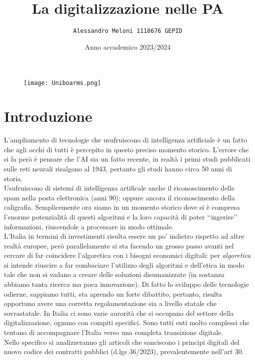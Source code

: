 \documentclass{article}
\title{\huge\textbf{La digitalizzazione nelle PA}}
\author{\texttt{Alessandro Meloni 1118676 GEPID}}
\date{Anno accademico 2023/2024}
\begin{document}
\begin{figure}
    \centering
    \texttt{[image: Uniboarms.png]}
\end{figure}
\maketitle

\centering \tableofcontents

\newpage\centering
\section{Introduzione}
\begin{justify}
L'ampliamento di tecnologie che usufruiscono di intelligenza artificiale è un fatto che agli occhi di tutti è percepito in questo preciso momento storico. L'errore che si fa però è pensare che l'AI sia un fatto recente, in realtà i primi studi pubblicati sulle reti neurali risalgono al 1943, pertanto gli studi hanno circa 50 anni di storia.\citep{mcculloch1943logical}\\ Usufruiscono di sistemi di intelligenza artificale anche il riconoscimento delle spam nella posta elettronica (anni 90); oppure ancora il riconoscimento della caligrafia. Semplicemente ora siamo in un momento storico dove si è compresa l'enorme potenzialità di questi algoritmi e la loro capacità di poter ‘‘ingerire’’ informazioni, riuscendole a processare in modo ottimale.\\
L'Italia in termini di investimenti risulta essere un po' indietro rispetto ad altre realtà europee, però parallelamente si sta facendo un grosso passo avanti nel cercare di far coincidere l'algoretica con i bisogni economici digitali: per \textit{algoretica} si intende riuscire a far combaciare l'utilizzo degli algoritmi e dell'etica in modo tale che non si vadano a creare delle soluzioni disumanizzate (in sostanza abbiamo tanta ricerca ma poca innovazione).
Di fatto lo sviluppo delle tecnologie odierne, sappiamo tutti, sta aprendo un forte dibattito, pertanto, risulta opportuno avere una corretta regolamentazione sia a livello statale che sovrastatale.
In Italia ci sono varie aurorità che si occupano del settore della digitalizzazione, ognuno con compiti specifici.
Sono tutti enti molto complessi che tentano di accompagnare l'Italia verso una completa transizione digitale.\\
Nello specifico si analizzeranno gli articoli che sanciscono i principi digitali del nuovo codice dei contratti pubblici (d.lgs 36/2023), prevalentemente nell'art 30.\\

\end{justify}
\end{document}
